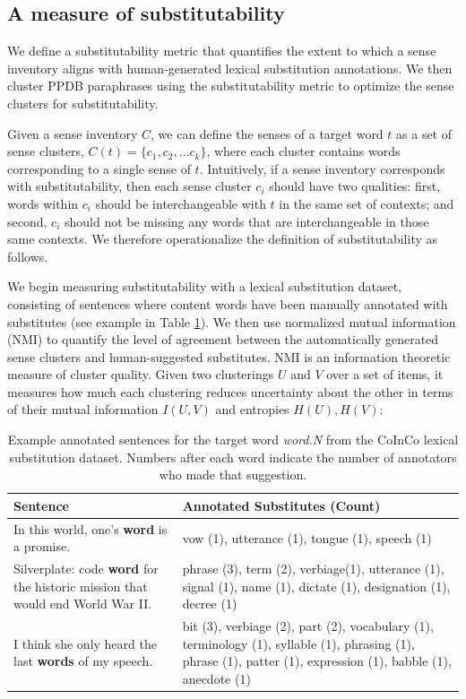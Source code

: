 \documentclass[11pt]{article}
\begin{document}
	\subsection{A measure of substitutability}
	\label{nmi} 
	
	We define a substitutability metric that quantifies the extent to which a sense inventory aligns with human-generated lexical substitution annotations. We then cluster PPDB paraphrases using the substitutability metric to optimize the sense clusters for substitutability. 
	
	Given a sense inventory $C$, we can define the senses of a target word $t$ as a set of sense clusters, $C(t) = \{c_1, c_2, \dots c_k\}$, where each cluster contains words corresponding to a single sense of $t$. Intuitively, if a sense inventory corresponds with substitutability, then each sense cluster $c_i$ should have two qualities: first, words within $c_i$ should be interchangeable with $t$ in the same set of contexts; and second, $c_i$ should not be missing any words that are interchangeable in those same contexts. We therefore operationalize the definition of substitutability as follows. 
	
	We begin measuring substitutability with a lexical substitution dataset, consisting of sentences where content words have been  manually annotated with substitutes (see example in Table \ref{tab:lexsub}). 
	We then use normalized mutual information (NMI) \cite{strehl2002cluster} to quantify the level of agreement between the automatically generated sense clusters and human-suggested substitutes. NMI is an information theoretic measure of cluster quality. Given two clusterings $U$ and $V$ over a set of items, it measures how much each clustering reduces uncertainty about the other \cite{vinh2009information} in terms of their mutual information $I(U,V)$ and entropies $H(U), H(V)$:
	
	\begin{table}[t]
		\small
		\begin{tabular}{p{} p{}}
			\hline
			Sentence & Annotated Substitutes (Count) \\ \hline \hline
			In this world, one's \textbf{word} is a promise. & vow (1), utterance (1), tongue (1), speech (1) \\ \hline
			Silverplate: code \textbf{word} for the historic mission that would end World War II. & phrase (3), term (2), verbiage(1), utterance (1), signal (1), name (1), dictate (1), designation (1), decree (1) \\ \hline
			I think she only heard the last \textbf{words} of my speech. & bit (3), verbiage (2), part (2), vocabulary (1), terminology (1), syllable (1), phrasing (1), phrase (1), patter (1), expression (1), babble (1), anecdote (1) \\
		\end{tabular}
		\caption{Example annotated sentences for the target word \textit{word.N} from the CoInCo \cite{kremer-EtAl:2014:EACL} lexical substitution dataset. Numbers after each word indicate the number of annotators who made that suggestion.}
		\label{tab:lexsub}
	\end{table}
	
\end{document}
